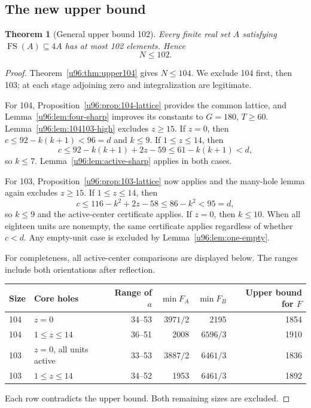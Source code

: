 \documentclass[11pt,a4paper]{article}
\newtheorem{theorem}{Theorem}[section]
\theoremstyle{remark}
\newcommand{\FS}{\operatorname{FS}}
\begin{document}
\subsection{The new upper bound}
\begin{theorem}[General upper bound 102]\label{u96:thm:upper102}
Every finite real set $A$ satisfying $\FS(A)\subseteq4A$ has at most
102 elements. Hence
\[
 \boxed{N\leq102.}
\]
\end{theorem}
\begin{proof}
Theorem~\ref{u96:thm:upper104} gives $N\leq104$. We exclude 104 first, then
103; at each stage adjoining zero and integralization are legitimate.

For 104, Proposition~\ref{u96:prop:104-lattice} provides the common lattice,
and Lemma~\ref{u96:lem:four-sharp} improves its constants to $G=180$, $T\geq60$.
Lemma~\ref{u96:lem:104103-high} excludes $z\geq15$. If $z=0$, then
$c\leq92-k(k+1)<96=d$ and $k\leq9$. If $1\leq z\leq14$, then
\[
 c\leq92-k(k+1)+2z-59\leq61-k(k+1)<d,
\]
so $k\leq7$. Lemma~\ref{u96:lem:active-sharp} applies in both cases.

For 103, Proposition~\ref{u96:prop:103-lattice} now applies and the many-hole
lemma again excludes $z\geq15$. If $1\leq z\leq14$, then
\[
 c\leq116-k^2+2z-58\leq86-k^2<95=d,
\]
so $k\leq9$ and the active-center certificate applies. If $z=0$, then
$k\leq10$. When all eighteen units are nonempty, the same certificate
applies regardless of whether $c<d$. Any empty-unit case is excluded by
Lemma~\ref{u96:lem:one-empty}.

For completeness, all active-center comparisons are displayed below.
The ranges include both orientations after reflection.
\begin{center}\small
\begin{tabular}{llrrrr}
\toprule
Size&Core holes&Range of $a$&$\min F_A$&$\min F_B$&Upper bound for $F$\\
\midrule
104&$z=0$&34--53&$3971/2$&2195&1854\\
104&$1\leq z\leq14$&36--51&2008&$6596/3$&1910\\
103&$z=0$, all units active&33--53&$3887/2$&$6461/3$&1836\\
103&$1\leq z\leq14$&34--52&1953&$6461/3$&1892\\
\bottomrule
\end{tabular}
\end{center}
Each row contradicts the upper bound. Both remaining sizes are excluded.
\end{proof}
\end{document}
